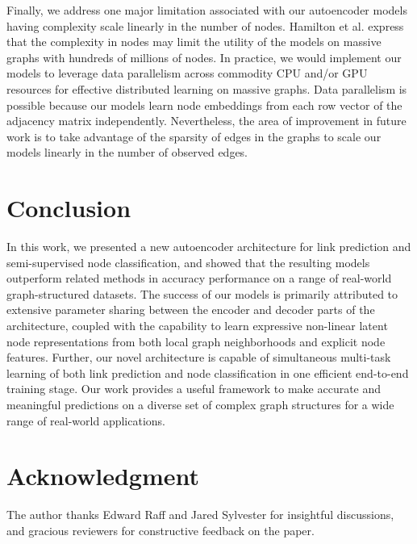 \documentclass[letterpaper, conference]{IEEEtran}  %
\begin{document}
Finally, we address one major limitation associated with our autoencoder models having complexity scale linearly in the number of nodes. Hamilton et al. \cite{Hamilton:2017} express that the complexity in nodes may limit the utility of the models on massive graphs with hundreds of millions of nodes. In practice, we would implement our models to leverage data parallelism \cite{Shrivastava:2017} across commodity CPU and/or GPU resources for effective distributed learning on massive graphs. Data parallelism is possible because our models learn node embeddings from each row vector of the adjacency matrix independently. Nevertheless, the area of improvement in future work is to take advantage of the sparsity of edges in the graphs to scale our models linearly in the number of observed edges.

%
\section{Conclusion}
%
In this work, we presented a new autoencoder architecture for link prediction and semi-supervised node classification, and showed that the resulting models outperform related methods in accuracy performance on a range of real-world graph-structured datasets. The success of our models is primarily attributed to extensive parameter sharing between the encoder and decoder parts of the architecture, coupled with the capability to learn expressive non-linear latent node representations from both local graph neighborhoods and explicit node features. Further, our novel architecture is capable of simultaneous multi-task learning of both link prediction and node classification in one efficient end-to-end training stage. Our work provides a useful framework to make accurate and meaningful predictions on a diverse set of complex graph structures for a wide range of real-world applications.

%
\section*{Acknowledgment}
%
The author thanks Edward Raff and Jared Sylvester for insightful discussions, and gracious reviewers for constructive feedback on the paper.

\end{document}
